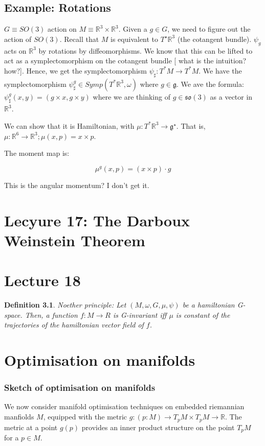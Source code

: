 \documentclass[11pt]{book}
\newcommand{\R}{\ensuremath{\mathbb R}}
\newcommand{\coT}{\ensuremath{T^*}}
\newtheorem{definition}[theorem]{Definition}
\begin{document}
\section{Example: Rotations}
$G \equiv SO(3)$ action on $M \equiv \R^3 \times \R^3$. Given a $g \in G$,
we need to figure out the action of $SO(3)$. Recall that $M$ is equivalent
to $T^\star \R^3$ (the cotangent bundle). $\psi_g$ acts on $\R^3$ by rotations by
diffeomorphisms. We know that this can be lifted to act as a symplectomorphism
on the cotangent bundle [ what is the intuition? how?]. Hence, we get
the symplectomorphism $\psi_\sharp: \coT M \rightarrow \coT M$. We have the 
symplectomorphism $\psi_\sharp^g \in Symp(\coT \R^3, \omega)$ where $g \in \mathfrak g$.
We ave the formula: $\psi_\sharp^g (x, y) = (g \times x, g \times y)$ where we are
thinking of $g \in \mathfrak{so}(3)$ as a vector in $\mathbb R^3$.

We can show that it is Hamiltonian, with $\mu: \coT \R^3 \rightarrow \mathfrak g^\star$.
That is, $\mu: \R^6 \rightarrow \R^3; \mu(x, p) = x \times p$.


The moment map is:

$$
\mu^g(x, p) = (x \times p) \cdot g
$$

This is the angular momentum? I don't get it.


\chapter{Lecyure 17: The Darboux Weinstein Theorem}

\chapter{Lecture 18}
\begin{definition}
Noether principle: Let $(M, \omega, G, \mu, \psi)$ be a hamiltonian G-space.
Then, a function $f: M \rightarrow R$ is G-invariant iff $\mu$ is constant
of the trajectories of the hamiltonian vector field of $f$.
\end{definition}

\chapter{Optimisation on manifolds}

\subsection{Sketch of optimisation on manifolds}
We now consider manifold optimisation techniques on embedded riemannian manfiolds $M$,
equipped with the metric $g: (p: M) \rightarrow T_p M  \times T_p M \rightarrow \mathbb R$.
The metric at a point $g(p)$ provides an inner product structure on the point $T_pM$
for a $p \in M$.
\end{document}
